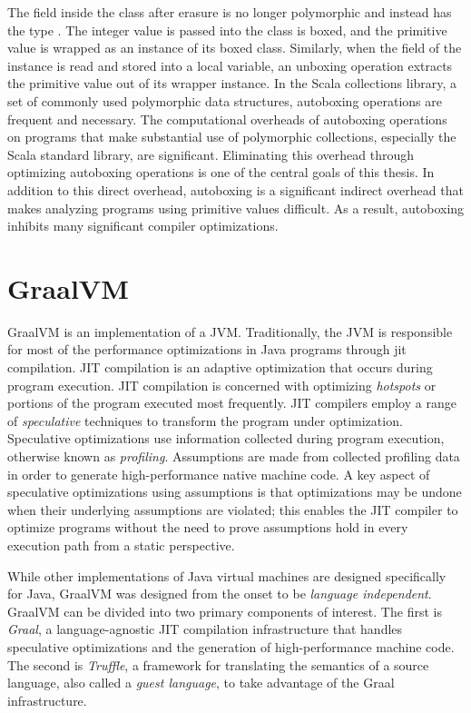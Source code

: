 The  field inside the  class after erasure is no longer polymorphic and instead has the type . 
The integer value  is passed into the  class is boxed, and the primitive value is wrapped as an instance of its boxed class.
Similarly, when the  field of the instance is read and stored into a local variable, an unboxing operation extracts the primitive value out of its wrapper instance.
In the Scala collections library, a set of commonly used polymorphic data structures, autoboxing operations are frequent and necessary.
The computational overheads of autoboxing operations on programs that make substantial use of polymorphic collections, especially the Scala standard library, are significant\cite{scala:collections-optimization}.
Eliminating this overhead through optimizing autoboxing operations is one of the central goals of this thesis.
In addition to this direct overhead, autoboxing is a significant indirect overhead that makes analyzing programs using primitive values difficult. As a result, autoboxing inhibits many significant compiler optimizations.

\section{GraalVM}

GraalVM\cite{java:graalvm} is an implementation of a JVM.
Traditionally, the JVM is responsible for most of the performance optimizations in Java programs\cite{java:hotspot} through \acrfull{jit} compilation.
JIT compilation is an adaptive optimization that occurs during program execution.
JIT compilation is concerned with optimizing \textit{hotspots} or portions of the program executed most frequently.
JIT compilers\cite{java:sablevm,java:jikesrvm} employ a range of \textit{speculative} techniques to transform the program under optimization.
Speculative optimizations use information collected during program execution, otherwise known as \textit{profiling}. 
Assumptions are made from collected profiling data in order to generate high-performance native machine code.
A key aspect of speculative optimizations using assumptions is that optimizations may be undone when their underlying assumptions are violated; this enables the JIT compiler to optimize programs without the need to prove assumptions hold in every execution path from a static perspective.

While other implementations of Java virtual machines are designed specifically for Java, GraalVM was designed from the onset to be \textit{language independent}.
GraalVM can be divided into two primary components of interest. 
The first is \textit{Graal}, a language-agnostic JIT compilation infrastructure that handles speculative optimizations and the generation of high-performance machine code.
The second is \textit{Truffle}, a framework for translating the semantics of a source language, also called a \textit{guest language}, to take advantage of the Graal infrastructure.

